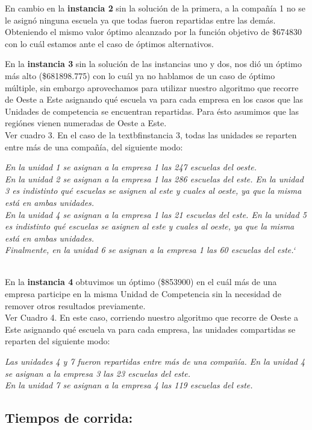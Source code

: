 \documentclass[12pt]{article}
\begin{document}
En cambio en la \textbf{instancia 2} sin la solución de la primera, a la compañía 1 no se le asignó ninguna escuela ya que todas fueron repartidas entre las demás. Obteniendo el mismo valor óptimo alcanzado por la función objetivo de \$$674830$ con lo cuál estamos ante el caso de óptimos alternativos.

\bigskip
En la \textbf{instancia 3} sin la solución de las instancias uno y dos, nos dió un óptimo más alto (\$681898.775) con lo cuál ya no hablamos de un caso de óptimo múltiple, sin embargo aprovechamos para utilizar nuestro algoritmo que recorre de Oeste a Este asignando qué escuela va para cada empresa en los casos que las Unidades de competencia se encuentran repartidas. Para ésto asumimos que las regiónes vienen numeradas de Oeste a Este.
\\Ver cuadro 3.
En el caso de la textbf{instancia 3}, todas las unidades se reparten entre más de una compañía, del siguiente modo:

\textit{En la unidad 1 se asignan a la empresa 1 las 247 escuelas del oeste.\\
En la unidad 2 se asignan a la empresa 1 las 286 escuelas del este. En la unidad 3 es indistinto qué escuelas se asignen al este y cuales al oeste, ya que la misma está en ambas unidades.\\
En la unidad 4 se asignan a la empresa 1 las 21 escuelas del este. En la unidad 5 es indistinto qué escuelas se asignen al este y cuales al oeste, ya que la misma está en ambas unidades.\\
Finalmente, en la unidad 6 se asignan a la empresa 1 las 60 escuelas del este.`}


\\

En la \textbf{instancia 4} obtuvimos un óptimo (\$853900) en el cuál más de una empresa participe en la misma Unidad de Competencia sin la necesidad de remover otros resultados previamente. 
\\Ver Cuadro 4.
En este caso, corriendo nuestro algoritmo que recorre de Oeste a Este asignando qué escuela va para cada empresa, las unidades compartidas se reparten del siguiente modo:

\textit{Las unidades 4 y 7 fueron repartidas entre más de una compañía. En la unidad 4 se asignan a la empresa 3 las 23 escuelas del este.\\
En la unidad 7 se asignan a la empresa 4 las 119 escuelas del este.}
\subsection{Tiempos de corrida:}
\end{document}
